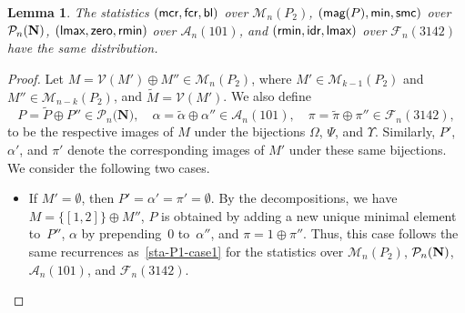 \documentclass[11pt]{article}
\DeclareMathOperator{\bl}{\mbox{\sf{bl}}}
\DeclareMathOperator{\mcr}{\mbox{\sf{mcr}}}
\DeclareMathOperator{\smc}{\mbox{\sf{smc}}}
\DeclareMathOperator{\magg}{\mbox{\sf{mag}}}
\DeclareMathOperator{\minn}{\mbox{\sf{min}}}
\DeclareMathOperator{\idr}{\mbox{\sf{idr}}}
\DeclareMathOperator{\lmax}{\mbox{\sf{lmax}}}
\DeclareMathOperator{\rmin}{\mbox{\sf{rmin}}}
\DeclareMathOperator{\zero}{\mbox{\sf{zero}}}
\DeclareMathOperator{\fcr}{\mbox{\sf{fcr}}}
\newtheorem{lem}[thm]{Lemma}
\newcommand{\A}{\mathcal{A}}
\newcommand{\PP}{{\mathcal P}}
\newcommand{\F}{\mathcal{F}}
\newcommand{\M}{\mathcal{M}}
\newcommand{\V}{\mathcal{V}}
\begin{document}
	\begin{lem}\label{lem-P2-N-101-3142}
		The statistics $(\mcr, \fcr, \bl)$ over $\M_n(P_2)$, $(\magg(P), \minn, \smc)$ over $\PP_n\bf{(N)}$, $(\lmax, \zero, \rmin)$ over $\A_n(101)$, and $(\rmin, \idr, \lmax)$ over $\F_n(3142)$ have the same distribution.
	\end{lem} 
	\begin{proof} 
		Let $M= \V(M') \oplus M'' \in \M_n(P_2)$, where $M' \in \M_{k-1}(P_2)$ and $M'' \in \M_{n-k}(P_2)$, and $\widetilde{M}=\V(M')$. 
		We also define
		\[
		P=\widetilde{P}\oplus P''\in\PP_{n}\textbf{(N)},\quad
		\alpha=\widetilde{\alpha}\oplus\alpha'' \in \A_n(101),\quad
		\pi=\widetilde{\pi}\oplus\pi'' \in \F_n(3142),
		\]
		to be the respective images of $M$ under the bijections $\Omega$, $\Psi$, and $\Upsilon$. Similarly, $P'$, $\alpha'$, and $\pi'$ denote the corresponding images of $M'$ under these same bijections. We consider the following two cases.
		\begin{itemize}
			\item If $M' =\emptyset$, then $P'=\alpha'=\pi'=\emptyset$. 
			By the decompositions, we have  
			$M=\{[1,2]\}\oplus M''$,  
			$P$ is obtained by adding a new unique minimal element to~$P''$, 
			$\alpha$ by prepending~$0$ to~$\alpha''$, and  
			$\pi=1\oplus \pi''$. 
			Thus, this case follows the same recurrences as~\eqref{sta-P1-case1} for the statistics over $\M_n(P_{2})$, $\PP_{n}\bf{(N)}$, $\A_n(101)$, and $\F_n(3142)$.
			

\end{itemize}
\end{proof}
\end{document}
